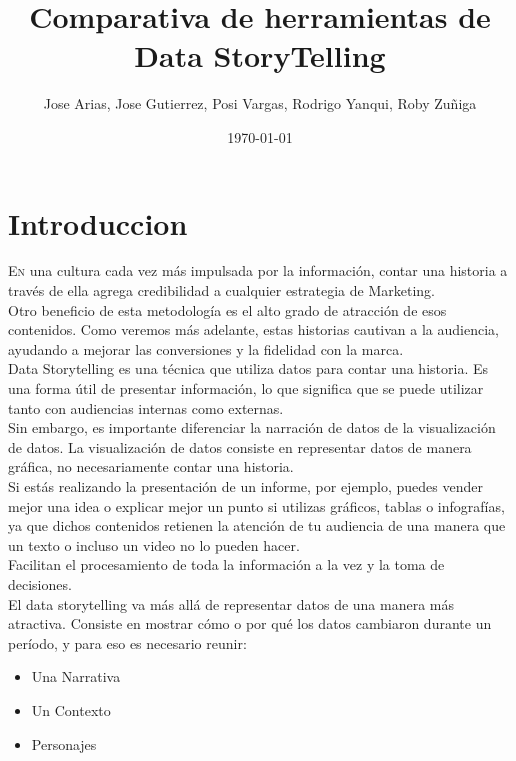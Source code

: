 \documentclass[twoside,twocolumn]{article}
\title{Comparativa de herramientas de Data StoryTelling}
\author{Jose Arias, Jose Gutierrez, Posi Vargas, Rodrigo Yanqui, Roby Zuñiga}
\date{\today}
\begin{document}
\maketitle


\section{Introduccion}
\lettrine[nindent=0em,lines=3]{E}n una cultura cada vez más impulsada por la información, contar una historia a través de ella agrega credibilidad a cualquier estrategia de Marketing.\\[0.1in]
Otro beneficio de esta metodología es el alto grado de atracción de esos contenidos. Como veremos más adelante, estas historias cautivan a la audiencia, ayudando a mejorar las conversiones y la fidelidad con la marca.\\[0.1in]
Data Storytelling es una técnica que utiliza datos para contar una historia. Es una forma útil de presentar información, lo que significa que se puede utilizar tanto con audiencias internas como externas.\\[0.1in]
Sin embargo, es importante diferenciar la narración de datos de la visualización de datos. La visualización de datos consiste en representar datos de manera gráfica, no necesariamente contar una historia.\\[0.1in]
Si estás realizando la presentación de un informe, por ejemplo, puedes vender mejor una idea o explicar mejor un punto si utilizas gráficos, tablas o infografías, ya que dichos contenidos retienen la atención de tu audiencia de una manera que un texto o incluso un video no lo pueden hacer.\\[0.1in]
Facilitan el procesamiento de toda la información a la vez y la toma de decisiones.\\[0.1in]
El data storytelling va más allá de representar datos de una manera más atractiva. Consiste en mostrar cómo o por qué los datos cambiaron durante un período, y para eso es necesario reunir:
\begin{itemize}
    \item Una Narrativa
    \item Un Contexto
    \item Personajes
\end{itemize}
\end{document}
